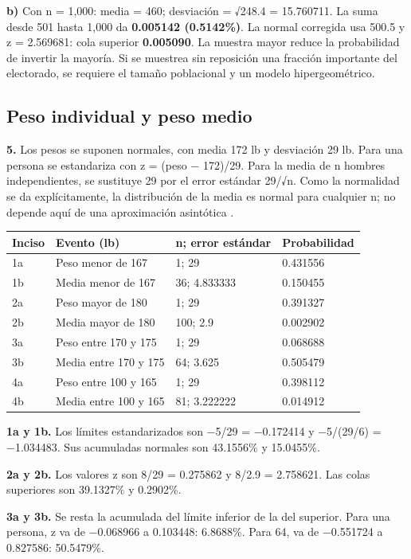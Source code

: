 {\textbf{b)} Con n = 1,000: media = 460; desviación = √248.4 = 15.760711. La suma desde 501 hasta 1,000 da \textbf{0.005142 (0.5142\%)}. La normal corregida usa 500.5 y z = 2.569681: cola superior \textbf{0.005090}. La muestra mayor reduce la probabilidad de invertir la mayoría. Si se muestrea sin reposición una fracción importante del electorado, se requiere el tamaño poblacional y un modelo hipergeométrico.

\clearpage
\subsection{Peso individual y peso medio}
\textbf{5.} Los pesos se suponen normales, con media 172 lb y desviación 29 lb. Para una persona se estandariza con z = (peso − 172)/29. Para la media de n hombres independientes, se sustituye 29 por el error estándar 29/√n. Como la normalidad se da explícitamente, la distribución de la media es normal para cualquier n; no depende aquí de una aproximación asintótica \citep{holmesBusiness2023}.

\begin{center}
\begin{tabular}{llll}
\textbf{Inciso} & \textbf{Evento (lb)} & \textbf{n; error estándar} & \textbf{Probabilidad}\\\hline
1a & Peso menor de 167 & 1; 29 & 0.431556\\
1b & Media menor de 167 & 36; 4.833333 & 0.150455\\
2a & Peso mayor de 180 & 1; 29 & 0.391327\\
2b & Media mayor de 180 & 100; 2.9 & 0.002902\\
3a & Peso entre 170 y 175 & 1; 29 & 0.068688\\
3b & Media entre 170 y 175 & 64; 3.625 & 0.505479\\
4a & Peso entre 100 y 165 & 1; 29 & 0.398112\\
4b & Media entre 100 y 165 & 81; 3.222222 & 0.014912\\
\end{tabular}
\end{center}

\textbf{1a y 1b.} Los límites estandarizados son −5/29 = −0.172414 y −5/(29/6) = −1.034483. Sus acumuladas normales son 43.1556\% y 15.0455\%.

\textbf{2a y 2b.} Los valores z son 8/29 = 0.275862 y 8/2.9 = 2.758621. Las colas superiores son 39.1327\% y 0.2902\%.

\textbf{3a y 3b.} Se resta la acumulada del límite inferior de la del superior. Para una persona, z va de −0.068966 a 0.103448: 6.8688\%. Para 64, va de −0.551724 a 0.827586: 50.5479\%.

}
